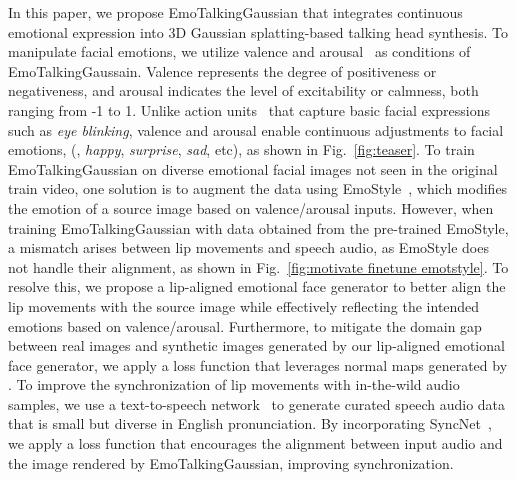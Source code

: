In this paper, we propose EmoTalkingGaussian that integrates continuous emotional expression into 3D Gaussian splatting-based talking head synthesis. To manipulate facial emotions, we utilize valence and arousal~\cite{russell1980circumplex} as conditions of EmoTalkingGaussain. Valence represents the degree of positiveness or negativeness, and arousal indicates the level of excitability or calmness, both ranging from -1 to 1. Unlike action units~\cite{ekman1978facial} that capture basic facial expressions such as \emph{eye blinking}, valence and arousal enable continuous adjustments to facial emotions, (\eg, \emph{happy}, \emph{surprise}, \emph{sad}, etc), as shown in Fig.~\ref{fig:teaser}. To train EmoTalkingGaussian on diverse emotional facial images not seen in the original train video, one solution is to augment the data using EmoStyle~\cite{azari2024emostyle}, which modifies the emotion of a source image based on valence/arousal inputs.
However, when training EmoTalkingGaussian with data obtained from the pre-trained EmoStyle, a mismatch arises between lip movements and speech audio, as EmoStyle does not handle their alignment, as shown in Fig.~\ref{fig:motivate finetune emotstyle}. To resolve this, we propose a lip-aligned emotional face generator to better align the lip movements with the source image while effectively reflecting the intended emotions based on valence/arousal. Furthermore, to mitigate the domain gap between real images and synthetic images generated by our lip-aligned emotional face generator, we apply a loss function that leverages normal maps generated by \cite{Abrevaya_2020_CVPR}. To improve the synchronization of lip movements with in-the-wild audio samples, we use a text-to-speech network~\cite{gTTS} to generate curated speech audio data that is small but diverse in English pronunciation. By incorporating SyncNet~\cite{chung2017out}, we apply a loss function that encourages the alignment between input audio and the image rendered by EmoTalkingGaussian, improving synchronization.

